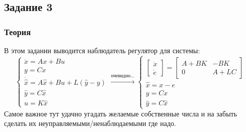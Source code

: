 \subsection{Задание 3}

\subsubsection{Теория}
В этом задании выводится наблюдатель регулятор для системы:
\[
        \begin{cases}
                \dot{x} = A x + B u\\
                y = C x \\
                \dot{\hat{x}} = A \hat{x} + B u + L(\hat{y} - y) \\
                \hat{y} = C \hat{x} \\
                u = K \hat{x}
        \end{cases} \xrightarrow{\text{очевидно...}}
        \begin{cases}
            \begin{bmatrix} 
                \dot{x} \\
                \dot{e}
            \end{bmatrix} = 
            \begin{bmatrix} 
                A + BK & -BK\\
                0 & A + LC
            \end{bmatrix}\\
            \hat{x} = x - e \\
            y = Cx \\
            \hat{y} = C \hat{x}
         \end{cases}
\]
Самое важное тут удачно угадать желаемые собственные числа и на забыть сделать их неуправляемыми/ненаблюдаемыми где надо.
